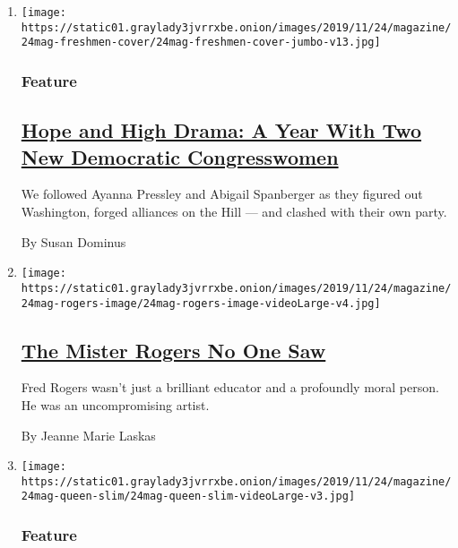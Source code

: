 \begin{enumerate}
\def\labelenumi{\arabic{enumi}.}
\item
  \texttt{[image: https://static01.graylady3jvrrxbe.onion/images/2019/11/24/magazine/24mag-freshmen-cover/24mag-freshmen-cover-jumbo-v13.jpg]}

  \hypertarget{feature}{%
  \subsubsection{Feature}\label{feature}}

  \hypertarget{hope-and-high-drama-a-year-with-two-new-democratic-congresswomen}{%
  \subsection{\texorpdfstring{\href{/2019/11/18/magazine/ayanna-pressley-abigail-spanberger-democratic-women-congress.html}{Hope
  and High Drama: A Year With Two New Democratic
  Congresswomen}}{Hope and High Drama: A Year With Two New Democratic Congresswomen}}\label{hope-and-high-drama-a-year-with-two-new-democratic-congresswomen}}

  We followed Ayanna Pressley and Abigail Spanberger as they figured out
  Washington, forged alliances on the Hill --- and clashed with their
  own party.

  By Susan Dominus
\item
  \texttt{[image: https://static01.graylady3jvrrxbe.onion/images/2019/11/24/magazine/24mag-rogers-image/24mag-rogers-image-videoLarge-v4.jpg]}

  \hypertarget{the-mister-rogers-no-one-saw}{%
  \subsection{\texorpdfstring{\href{/2019/11/19/magazine/mr-rogers.html}{The
  Mister Rogers No One
  Saw}}{The Mister Rogers No One Saw}}\label{the-mister-rogers-no-one-saw}}

  Fred Rogers wasn't just a brilliant educator and a profoundly moral
  person. He was an uncompromising artist.

  By Jeanne Marie Laskas
\item
  \texttt{[image: https://static01.graylady3jvrrxbe.onion/images/2019/11/24/magazine/24mag-queen-slim/24mag-queen-slim-videoLarge-v3.jpg]}

  \hypertarget{feature-1}{%
  \subsubsection{Feature}\label{feature-1}}


\end{enumerate}
